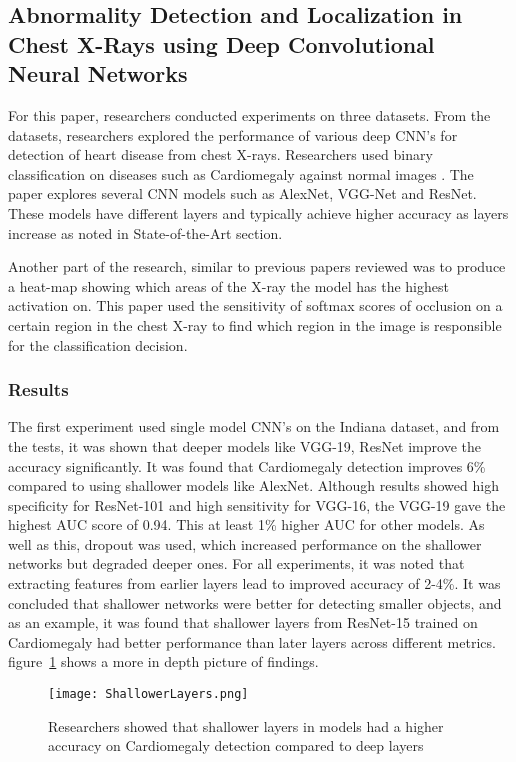 \setcounter{secnumdepth}{4}
\subsection{Abnormality Detection and Localization in Chest X-Rays using Deep Convolutional Neural Networks}

For this paper, researchers conducted experiments on three datasets. From the datasets, researchers explored the performance of various deep CNN's for detection of heart disease from chest X-rays. Researchers used binary classification on diseases such as Cardiomegaly against normal images \cite{islam2017abnormality}. The paper explores several CNN models such as AlexNet, VGG-Net and ResNet. These models have different layers and typically achieve higher accuracy as layers increase as noted in State-of-the-Art section.

Another part of the research, similar to previous papers reviewed was to produce a heat-map showing which areas of the X-ray the model has the highest activation on. This paper used the sensitivity of softmax scores of occlusion on a certain region in the chest X-ray to find which region in the image is responsible for the classification decision.  
\subsubsection {Results}

The first experiment used single model CNN's on the Indiana dataset, and from the tests, it was shown that deeper models like VGG-19, ResNet improve the accuracy significantly. It was found that Cardiomegaly detection improves 6\% compared to using shallower models like AlexNet. Although results showed high specificity for ResNet-101 and high sensitivity for VGG-16, the VGG-19 gave the highest AUC score of 0.94. This at least 1\% higher AUC for other models. 
As well as this, dropout was used, which increased performance on the shallower networks but degraded deeper ones. For all experiments, it was noted that extracting features from earlier layers lead to improved accuracy of 2-4\%. It was concluded that shallower networks were better for detecting smaller objects, and as an example, it was found that shallower layers from ResNet-15 trained on Cardiomegaly had better performance than later layers across different metrics. figure~\ref{fig:Shallow} shows a more in depth picture of findings. 

\begin{figure}[H]
	\centering
	\texttt{[image: ShallowerLayers.png]}
	\caption{Researchers showed that shallower layers in models had a higher accuracy on Cardiomegaly detection compared to deep layers}
	\label{fig:Shallow}
\end{figure}


